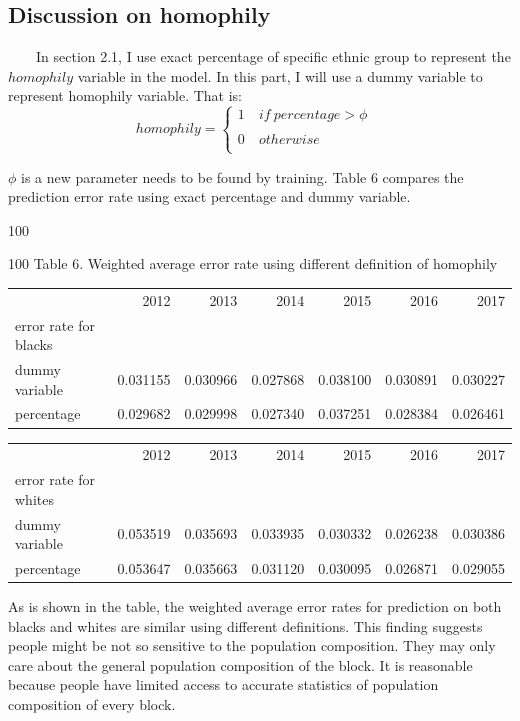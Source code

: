 \documentclass{article}
\begin{document}
\subsection{Discussion on homophily}
\ \ \ \ In section 2.1, I use exact percentage of specific ethnic group to represent the $homophily$ variable in the model. In this part, I will use a dummy variable to represent homophily variable. That is:
\begin{equation}
homophily=\left\{
\begin{aligned}
1 & \ if\ percentage > \phi & \\
& & \\
0 & \ otherwise & \\
\end{aligned}
\right.
\end{equation}
\par $\phi$ is a new parameter needs to be found by training. Table 6 compares the prediction error rate using exact percentage and dummy variable.
\par {\color{white} 100}
\par \centerline{{\color{white} 100} Table 6. Weighted average error rate using different definition of homophily}
\begin{table}[!h]
\begin{tabular}{lrrrrrr}
\toprule
{} &      2012 &      2013 &      2014 &      2015 &      2016 &      2017 \\
error rate for blacks &           &           &           &           &           &           \\
\midrule
dummy variable      &  0.031155 &  0.030966 &  0.027868 &  0.038100 &  0.030891 &  0.030227 \\
percentage      &  0.029682 &  0.029998 &  0.027340 &  0.037251 &  0.028384 &  0.026461 \\
\bottomrule
\end{tabular}
\begin{tabular}{lrrrrrr}
\toprule
{} &      2012 &      2013 &      2014 &      2015 &      2016 &      2017 \\
error rate for whites &           &           &           &           &           &           \\
\midrule
dummy variable      &  0.053519 &  0.035693 &  0.033935 &  0.030332 &  0.026238 &  0.030386 \\
percentage      &  0.053647 &  0.035663 &  0.031120 &  0.030095 &  0.026871 &  0.029055 \\
\bottomrule
\end{tabular}
\end{table}
\par As is shown in the table, the weighted average error rates for prediction on both blacks and whites are similar using different definitions. This finding suggests people might be not so sensitive to the population composition. They may only care about the general population composition of the block. It is reasonable because people have limited access to accurate statistics of population composition of every block.
\end{document}
